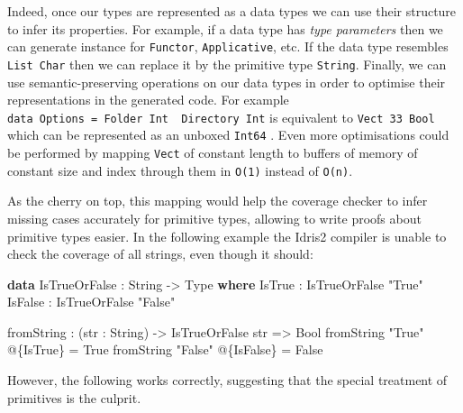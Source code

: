 \documentclass[
]{article}
\newenvironment{Shaded}{}{}
\newcommand{\DataTypeTok}[1]{\textcolor[rgb]{0.56,0.13,0.00}{#1}}
\newcommand{\KeywordTok}[1]{\textcolor[rgb]{0.00,0.44,0.13}{\textbf{#1}}}
\newcommand{\NormalTok}[1]{#1}
\newcommand{\OperatorTok}[1]{\textcolor[rgb]{0.40,0.40,0.40}{#1}}
\newcommand{\OtherTok}[1]{\textcolor[rgb]{0.00,0.44,0.13}{#1}}
\newcommand{\StringTok}[1]{\textcolor[rgb]{0.25,0.44,0.63}{#1}}
\begin{document}
Indeed, once our types are represented as a data types we can use their
structure to infer its properties. For example, if a data type has
\emph{type parameters} then we can generate instance for
\texttt{Functor}, \texttt{Applicative}, etc. If the data type resembles
\texttt{List\ Char} then we can replace it by the primitive type
\texttt{String}. Finally, we can use semantic-preserving operations on
our data types in order to optimise their representations in the
generated code. For example
\texttt{data\ Options\ =\ Folder\ Int\ \textbar{}\ Directory\ Int} is
equivalent to \texttt{Vect\ 33\ Bool} which can be represented as an
unboxed \texttt{Int64} . Even more optimisations could be performed by
mapping \texttt{Vect} of constant length to buffers of memory of
constant size and index through them in \texttt{O(1)} instead of
\texttt{O(n)}.

As the cherry on top, this mapping would help the coverage checker to
infer missing cases accurately for primitive types, allowing to write
proofs about primitive types easier. In the following example the Idris2
compiler is unable to check the coverage of all strings, even though it
should:

\begin{Shaded}
\begin{Highlighting}[]
\KeywordTok{data} \DataTypeTok{IsTrueOrFalse} \OperatorTok{:} \DataTypeTok{String} \OtherTok{{-}\textgreater{}} \DataTypeTok{Type} \KeywordTok{where}
  \DataTypeTok{IsTrue} \OperatorTok{:} \DataTypeTok{IsTrueOrFalse} \StringTok{"True"}
  \DataTypeTok{IsFalse} \OperatorTok{:} \DataTypeTok{IsTrueOrFalse} \StringTok{"False"}

\NormalTok{fromString }\OperatorTok{:}\NormalTok{ (str }\OperatorTok{:} \DataTypeTok{String}\NormalTok{) }\OtherTok{{-}\textgreater{}} \DataTypeTok{IsTrueOrFalse}\NormalTok{ str }\OtherTok{=\textgreater{}} \DataTypeTok{Bool}
\NormalTok{fromString }\StringTok{"True"} \OperatorTok{@}\NormalTok{\{}\DataTypeTok{IsTrue}\NormalTok{\} }\OtherTok{=} \DataTypeTok{True}
\NormalTok{fromString }\StringTok{"False"} \OperatorTok{@}\NormalTok{\{}\DataTypeTok{IsFalse}\NormalTok{\} }\OtherTok{=} \DataTypeTok{False}
\end{Highlighting}
\end{Shaded}

However, the following works correctly, suggesting that the special
treatment of primitives is the culprit.
\end{document}
